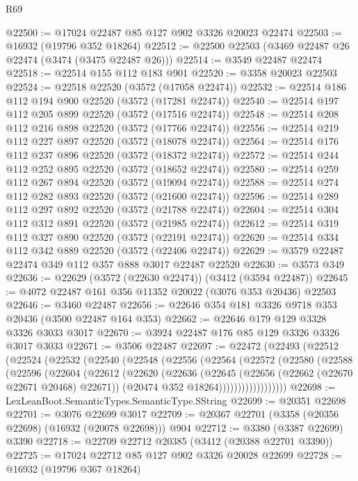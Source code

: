 \begin{lexlean}{R69}
\begin{coremodule}
@22500 := @17024 @22487 @85 @127 @902 @3326 @20023 @22474
@22503 := @16932 (@19796 @352 @18264)
@22512 := @22500 @22503 (@3469 @22487 @26 @22474 (@3474 (@3475 @22487 @26)))
@22514 := @3549 @22487 @22474
@22518 := @22514 @155 @112 @183 @901
@22520 := @3358 @20023 @22503
@22524 := @22518 @22520 (@3572 (@17058 @22474))
@22532 := @22514 @186 @112 @194 @900 @22520 (@3572 (@17281 @22474))
@22540 := @22514 @197 @112 @205 @899 @22520 (@3572 (@17516 @22474))
@22548 := @22514 @208 @112 @216 @898 @22520 (@3572 (@17766 @22474))
@22556 := @22514 @219 @112 @227 @897 @22520 (@3572 (@18078 @22474))
@22564 := @22514 @176 @112 @237 @896 @22520 (@3572 (@18372 @22474))
@22572 := @22514 @244 @112 @252 @895 @22520 (@3572 (@18652 @22474))
@22580 := @22514 @259 @112 @267 @894 @22520 (@3572 (@19094 @22474))
@22588 := @22514 @274 @112 @282 @893 @22520 (@3572 (@21600 @22474))
@22596 := @22514 @289 @112 @297 @892 @22520 (@3572 (@21788 @22474))
@22604 := @22514 @304 @112 @312 @891 @22520 (@3572 (@21985 @22474))
@22612 := @22514 @319 @112 @327 @890 @22520 (@3572 (@22191 @22474))
@22620 := @22514 @334 @112 @342 @889 @22520 (@3572 (@22406 @22474))
@22629 := @3579 @22487 @22474 @349 @112 @357 @888 @3017 @22487 @22520
@22630 := @3573 @349
@22636 := @22629 (@3572 (@22630 @22474)) (@3412 (@3594 @22487))
@22645 := @4072 @22487 @161 @356 @11352 @20022 (@3076 @353 @20436) @22503
@22646 := @3460 @22487
@22656 := @22646 @354 @181 @3326 @9718 @353 @20436 (@3500 @22487 @164 @353)
@22662 := @22646 @179 @129 @3328 @3326 @3033 @3017
@22670 := @3924 @22487 @176 @85 @129 @3326 @3326 @3017 @3033
@22671 := @3506 @22487
@22697 := @22472
    (@22493
      (@22512
        (@22524
          (@22532
            (@22540
              (@22548
                (@22556
                  (@22564
                    (@22572
                      (@22580
                        (@22588
                          (@22596
                            (@22604
                              (@22612
                                (@22620
                                  (@22636
                                    (@22645
                                      (@22656 (@22662 (@22670 @22671 @20468) @22671))
                                      (@20474 @352 @18264))))))))))))))))))
@22698 := LexLeanBoot.SemanticTypes.SemanticType.SString
@22699 := @20351 @22698
@22701 := @3076 @22699 @3017
@22709 := @20367 @22701 (@3358 (@20356 @22698) (@16932 (@20078 @22698))) @904
@22712 := @3380 (@3387 @22699) @3390
@22718 := @22709 @22712 @20385 (@3412 (@20388 @22701 @3390))
@22725 := @17024 @22712 @85 @127 @902 @3326 @20028 @22699
@22728 := @16932 (@19796 @367 @18264)

\end{coremodule}
\end{lexlean}
